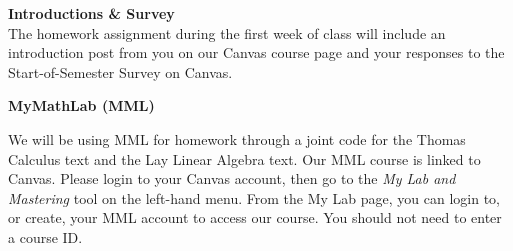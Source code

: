 \documentclass[11pt]{article}
\begin{document}
        
    \vspace{1 em}
    
    {\normalsize{\bf Introductions \& Survey}}\\
    
    The homework assignment during the first week of class will include an introduction post from you on our Canvas course page and your responses to the Start-of-Semester Survey on Canvas.
        
    \vspace{1 em}
        
    {\normalsize{\bf MyMathLab (MML)}}
        
    \vspace{0.5 em}
        
    We will be using MML for homework through a joint code for the Thomas Calculus text and the Lay Linear Algebra text. Our MML course is linked to Canvas.  Please login to your Canvas account, then go to the {\em My Lab and Mastering} tool on the left-hand menu.  From the My Lab page, you can login to, or create, your MML account to access our course.  You should not need to enter a course ID.\\
        
\end{document}
